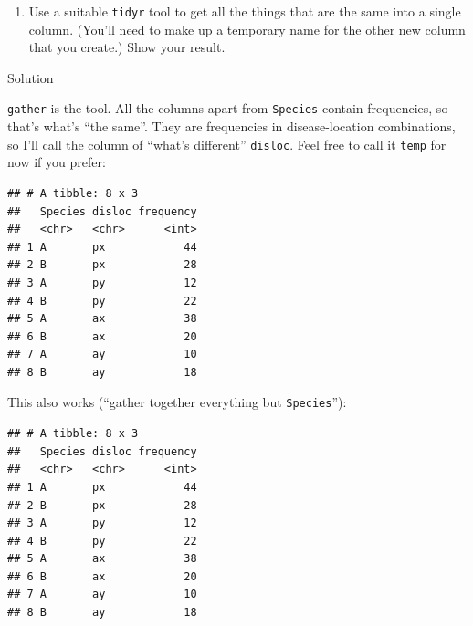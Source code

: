 \documentclass[]{tufte-book}
\newenvironment{Shaded}{}{}
\newcommand{\FloatTok}[1]{\textcolor[rgb]{0.25,0.63,0.44}{#1}}
\newcommand{\KeywordTok}[1]{\textcolor[rgb]{0.00,0.44,0.13}{\textbf{#1}}}
\newcommand{\NormalTok}[1]{#1}
\newcommand{\OperatorTok}[1]{\textcolor[rgb]{0.40,0.40,0.40}{#1}}
\newcommand{\StringTok}[1]{\textcolor[rgb]{0.25,0.44,0.63}{#1}}
\providecommand{\tightlist}{%
  \setlength{\itemsep}{0pt}\setlength{\parskip}{0pt}}
\theoremstyle{definition}
\theoremstyle{definition}
\theoremstyle{definition}
\theoremstyle{remark}
\begin{document}
\begin{enumerate}
\def\labelenumi{(\alph{enumi})}
\setcounter{enumi}{2}
\tightlist
\item
  Use a suitable \texttt{tidyr} tool to get all the things that are the
  same into a single column. (You'll need to make up a temporary name
  for the other new column that you create.) Show your result.
\end{enumerate}

Solution

\texttt{gather} is the tool. All the columns apart from \texttt{Species}
contain frequencies, so that's what's ``the same''. They are frequencies
in disease-location combinations, so I'll call the column of ``what's
different'' \texttt{disloc}. Feel free to call it \texttt{temp} for now
if you prefer:

\begin{Shaded}
\end{Shaded}

\begin{verbatim}
## # A tibble: 8 x 3
##   Species disloc frequency
##   <chr>   <chr>      <int>
## 1 A       px            44
## 2 B       px            28
## 3 A       py            12
## 4 B       py            22
## 5 A       ax            38
## 6 B       ax            20
## 7 A       ay            10
## 8 B       ay            18
\end{verbatim}

This also works (``gather together everything but \texttt{Species}''):

\begin{Shaded}
\end{Shaded}

\begin{verbatim}
## # A tibble: 8 x 3
##   Species disloc frequency
##   <chr>   <chr>      <int>
## 1 A       px            44
## 2 B       px            28
## 3 A       py            12
## 4 B       py            22
## 5 A       ax            38
## 6 B       ax            20
## 7 A       ay            10
## 8 B       ay            18
\end{verbatim}
\end{document}
